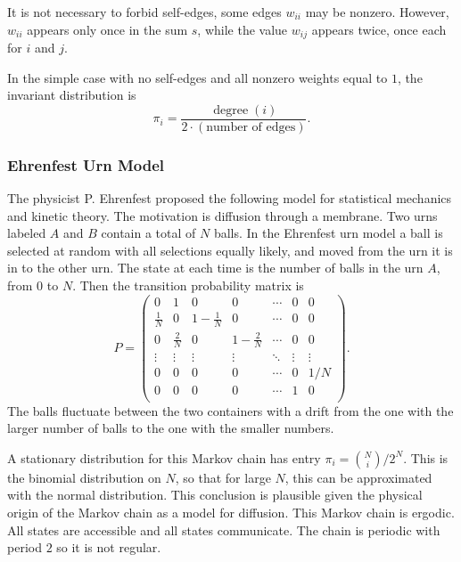 \documentclass[12pt]{article}
\begin{document}
It is not necessary to forbid self-edges, some edges $w_{ii}$ may be
nonzero.  However, $w_{ii}$ appears only once in the sum $s$, while
the value $w_{ij}$ appears twice, once each for $i$ and $j$.

In the simple case with no self-edges and all nonzero weights equal
to $1$, the invariant distribution is
\[
  \pi_i = \frac{\operatorname{degree}(i)}{2 \cdot (\text{number of
      edges})}.
\]


\subsubsection*{Ehrenfest Urn Model}

The physicist P. Ehrenfest proposed the following model for statistical
mechanics and kinetic theory.  The motivation is diffusion through a
membrane.  Two urns labeled \( A \) and \( B \) contain a total of \( N \)
balls.  In the Ehrenfest urn model a%
%
%
ball is selected at random with all selections equally likely, and moved
from the urn it is in to the other urn.  The state at each time is the
number of balls in the urn \( A \), from \( 0 \) to \( N \).  Then the
transition probability matrix is
\[
    P =
    \begin{pmatrix}
        0 & 1 & 0 & 0 & \cdots & 0 & 0 \\
        \frac{1}{N} & 0 & 1-\frac{1}{N} & 0 & \cdots & 0 & 0 \\
        0 & \frac{2}{N} & 0 & 1-\frac{2}{N} & \cdots & 0 & 0 \\
        \vdots & \vdots & \vdots & \vdots & \ddots& \vdots & \vdots \\
        0 & 0 & 0 & 0 & \cdots & 0 & 1/N \\
        0 & 0 & 0 & 0 & \cdots & 1 & 0 \\
    \end{pmatrix}.
\] The balls fluctuate between the two containers with a drift from the
one with the larger number of balls to the one with the smaller numbers.

A stationary distribution for this Markov chain has entry \( \pi_i =
\binom{N}{i}/2^N \).   This is the binomial distribution on \( N \),
so that for large \( N \), this can be approximated with the normal
distribution.  This conclusion is plausible given the physical origin of
the Markov chain as a model for diffusion. This Markov chain is
ergodic.  All states are accessible and all states communicate.  The
chain is periodic with period \( 2 \) so it is not regular.
\end{document}
